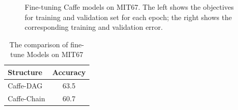 \documentclass[10pt,twocolumn,letterpaper]{article}
\begin{document}
\begin{figure}
\centering

\caption{Fine-tuning Caffe models on MIT67. The left shows the objectives for training and validation set for each epoch; the right shows the corresponding training and validation error.}
\label{fig:ft_curve}
\end{figure}




\begin{table}[htbp]
\begin{center}
\begin{tabular}{|l|c|}
\hline
Structure & Accuracy \\
\hline
Caffe-DAG & 63.5   \\
Caffe-Chain & 60.7   \\

\hline
\end{tabular}
\end{center}
\caption{The comparison of fine-tune Models on MIT67}
\label{table:ft_models}
\end{table}
\end{document}
